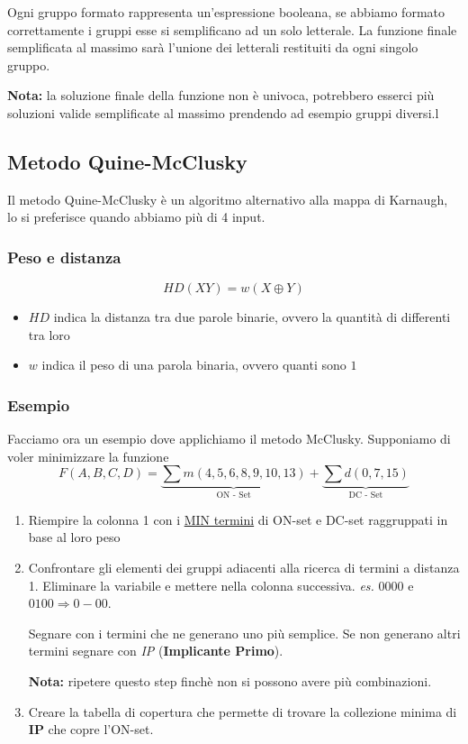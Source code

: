 \documentclass[../main.tex]{subfiles}
\begin{document}
Ogni gruppo formato rappresenta un'espressione booleana, se abbiamo formato correttamente i gruppi esse si semplificano ad un solo letterale.
La funzione finale semplificata al massimo sarà l'unione dei letterali restituiti da ogni singolo gruppo.

\textbf{Nota:} la soluzione finale della funzione non è univoca, potrebbero esserci più soluzioni valide semplificate al massimo prendendo
ad esempio gruppi diversi.l

\pagebreak
\subsection{Metodo Quine-McClusky}
Il metodo Quine-McClusky è un algoritmo alternativo alla mappa di Karnaugh, lo si preferisce quando abbiamo più di 4 input.

\subsubsection{Peso e distanza}
$$
    HD(XY) = w(X\oplus Y)
$$
\begin{itemize}
    \item $HD$ indica la distanza tra due parole binarie, ovvero la quantità di  differenti tra loro
    \item $w$ indica il peso di una parola binaria, ovvero quanti  sono $1$
\end{itemize}

\subsubsection{Esempio}
Facciamo ora un esempio dove applichiamo il metodo McClusky. Supponiamo di voler minimizzare la funzione
$$
    F(A,B,C,D) = \underbrace{\sum m(4,5,6,8,9,10,13)}_{\text{ON - Set}} + \underbrace{\sum d(0,7,15)}_{\text{DC - Set}}
$$

\vspace{0.2cm}
\begin{enumerate}
    \item Riempire la colonna 1 con i \underline{MIN termini} di ON-set e DC-set raggruppati in base al loro peso
    \item Confrontare gli elementi dei gruppi adiacenti alla ricerca di termini a distanza 1. Eliminare la variabile e mettere nella
    colonna successiva. \textit{es.} $0000$ e $0100 \Rightarrow 0-00$. 

    Segnare con \checkmark i termini che ne generano uno più semplice. Se non generano altri termini segnare con \textit{IP} (\textbf{Implicante Primo}).
    
    \textbf{Nota:} ripetere questo step finchè non si possono avere più combinazioni.
    \item Creare la tabella di copertura che permette di trovare la collezione minima di \textbf{IP} che copre l'ON-set.
\end{enumerate}
\end{document}
